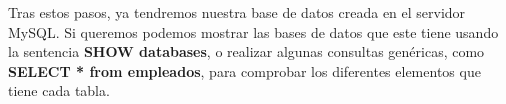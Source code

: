 Tras estos pasos, ya tendremos nuestra base de datos creada en el servidor MySQL. Si queremos podemos mostrar las bases de datos que este tiene usando la sentencia \textbf{SHOW databases}, o realizar algunas consultas genéricas, como \textbf{SELECT * from empleados}, para comprobar los diferentes elementos que tiene cada tabla.


\glsaddall
\printglossaries


\newpage
{}




